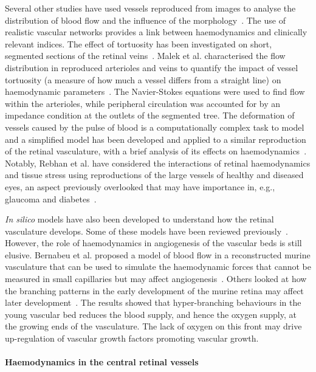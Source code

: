 \documentclass{article}
\begin{document}
Several other studies have used vessels reproduced from images to analyse the distribution of blood flow and the influence of the morphology~\cite{Malek_2014,Malek_2015,Rebhan_2019}.
The use of realistic vascular networks provides a link between haemodynamics and clinically relevant indices.
The effect of tortuosity has been investigated on short, segmented sections of the retinal veins~\cite{Malek_2014}.
Malek et al. characterised the flow distribution in reproduced arterioles and veins to quantify the impact of vessel tortuosity (a measure of how much a vessel differs from a straight line) on haemodynamic parameters~\cite{Malek_2014,Malek_2015}.
The Navier-Stokes equations were used to find flow within the arterioles, while peripheral circulation was accounted for by an impedance condition at the outlets of the segmented tree.
The deformation of vessels caused by the pulse of blood is a computationally complex task to model and a simplified model has been developed and applied to a similar reproduction of the retinal vasculature, with a brief analysis of its effects on haemodynamics~\cite{Aletti_2016}.
Notably, Rebhan et al. have considered the interactions of retinal haemodynamics and tissue stress using reproductions of the large vessels of healthy and diseased eyes, an aspect previously overlooked that may have importance in, e.g., glaucoma and diabetes~\cite{Rebhan_2019}.

\textit{In silico} models have also been developed to understand how the retinal vasculature develops.
Some of these models have been reviewed previously~\cite{Arciero_2019,Roberts_2016}.
However, the role of haemodynamics in angiogenesis of the vascular beds is still elusive.
Bernabeu et al. proposed a model of blood flow in a reconstructed murine vasculature that can be used to simulate the haemodynamic forces that cannot be measured in small capillaries but may affect angiogenesis~\cite{Bernabeu_2014}.
Others looked at how the branching patterns in the early development of the murine retina may affect later development~\cite{Mirzapour_Shafiyi_2021}.
The results showed that hyper-branching behaviours in the young vascular bed reduces the blood supply, and hence the oxygen supply, at the growing ends of the vasculature.
The lack of oxygen on this front may drive up-regulation of vascular growth factors promoting vascular growth.


\paragraph*{Haemodynamics in the central retinal vessels}
\end{document}
